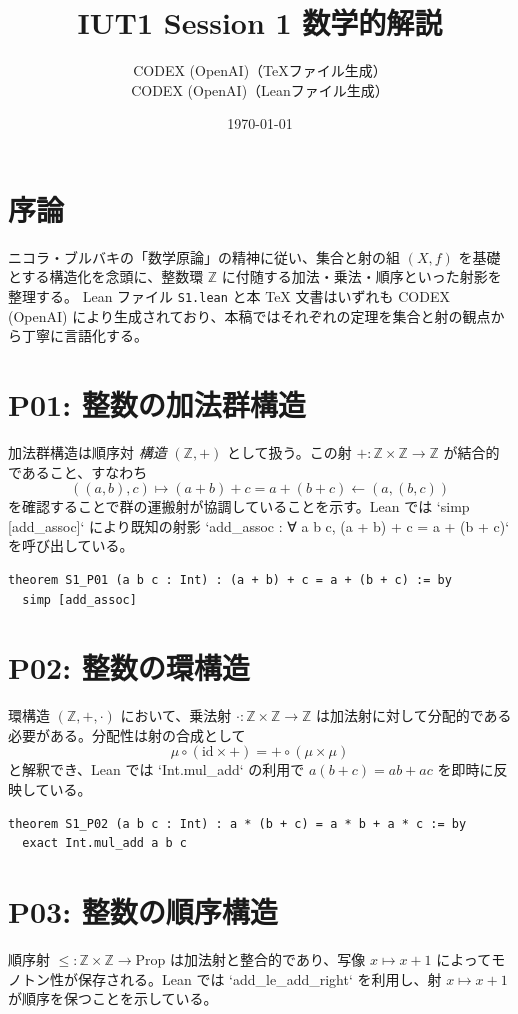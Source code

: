 \documentclass[a4paper]{ltjsarticle}
\title{IUT1 Session 1 数学的解説}
\author{CODEX (OpenAI)（TeXファイル生成）\\CODEX (OpenAI)（Leanファイル生成）}
\date{\today}
\begin{document}
\maketitle
\tableofcontents

\section{序論}
ニコラ・ブルバキの「数学原論」の精神に従い、集合と射の組 $(X, f)$ を基礎とする構造化を念頭に、整数環 $\mathbb{Z}$ に付随する加法・乗法・順序といった射影を整理する。\LINEBREAK
Lean ファイル \texttt{S1.lean} と本 TeX 文書はいずれも CODEX (OpenAI) により生成されており、本稿ではそれぞれの定理を集合と射の観点から丁寧に言語化する。

\section{P01: 整数の加法群構造}
加法群構造は順序対 \emph{構造} $({\mathbb{Z}}, +)$ として扱う。この射 $+ : \mathbb{Z} \times \mathbb{Z} \to \mathbb{Z}$ が結合的であること、すなわち
\[
((a,b),c) \mapsto (a + b) + c = a + (b + c) \gets (a,(b,c))
\]
を確認することで群の運搬射が協調していることを示す。Lean では `simp [add_assoc]` により既知の射影 `add_assoc : ∀ a b c, (a + b) + c = a + (b + c)` を呼び出している。
\begin{lstlisting}[caption={Lean 証明: S1\_P01},label={lst:P01}]
theorem S1_P01 (a b c : Int) : (a + b) + c = a + (b + c) := by
  simp [add_assoc]
\end{lstlisting}

\section{P02: 整数の環構造}
環構造 $({\mathbb{Z}}, +, \cdot)$ において、乗法射 $\cdot : \mathbb{Z} \times \mathbb{Z} \to \mathbb{Z}$ は加法射に対して分配的である必要がある。分配性は射の合成として
\[
\mu \circ (\mathrm{id} \times +) = + \circ (\mu \times \mu)
\]
と解釈でき、Lean では `Int.mul_add` の利用で $a(b+c) = ab + ac$ を即時に反映している。

\begin{lstlisting}[caption={Lean 証明: S1\_P02},label={lst:P02}]
theorem S1_P02 (a b c : Int) : a * (b + c) = a * b + a * c := by
  exact Int.mul_add a b c
\end{lstlisting}

\section{P03: 整数の順序構造}
順序射 $\leqslant : \mathbb{Z} \times \mathbb{Z} \to \mathrm{Prop}$ は加法射と整合的であり、写像 $x \mapsto x + 1$ によってモノトン性が保存される。Lean では `add_le_add_right` を利用し、射 $x \mapsto x + 1$ が順序を保つことを示している。
\end{document}
